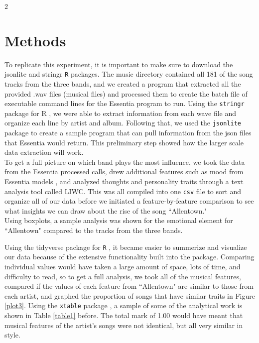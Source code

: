 \documentclass{article}\usepackage[]{graphicx}\usepackage[]{xcolor}
\begin{document}
\begin{multicols}{2}
\section{Methods}
To replicate this experiment, it is important to make sure to download the jsonlite and stringr \texttt{R} packages. The music directory contained all 181 of the song tracks from the three bands, and we created a program that extracted all the provided .wav files (musical files) and processed them to create the batch file of executable command lines for the Essentia program to run. Using the \texttt{stringr} \citep{st} package for R , we were able to extract information from each wave file and organize each line by artist and album. Following that, we used the \texttt{jsonlite} \citep{js} package to create a sample program that can pull information from the json files that Essentia would return. This preliminary step showed how the larger scale data extraction will work. \\
\indent To get a full picture on which band plays the most influence, we took the data from the Essentia processed calls, drew additional features such as mood from Essentia models \citep{alonso2020tensorflow}, and analyzed thoughts and personality traits through a text analysis tool called LIWC. This was all compiled into one \texttt{csv} file to sort and organize all of our data before we initiated a feature-by-feature comparison to see what insights we can draw about the rise of the song ``Allentown." \\
\indent Using boxplots, a sample analysis was shown for the emotional element for ``Allentown" compared to the tracks from the three bands. 

Using the tidyverse package for \texttt{R} \citep{tidyverse}, it became easier to summerize and visualize our data because of the extensive functionality built into the package. Comparing individual values would have taken a large amount of space, lots of time, and difficulty to read, so to get a full analysis, we took all of the musical features, compared if the values of each feature from ``Allentown" are similar to  those from each artist, and graphed the proportion of songs that have similar traits in Figure \ref{plot3}. Using the \texttt{xtable} package \citep{xtable}, a sample of some of the analytical work is shown in Table \ref{table1} before. The total mark of 1.00 would have meant that musical features of the artist's songs were not identical, but all very similar in style. 




\end{multicols}
\end{document}
